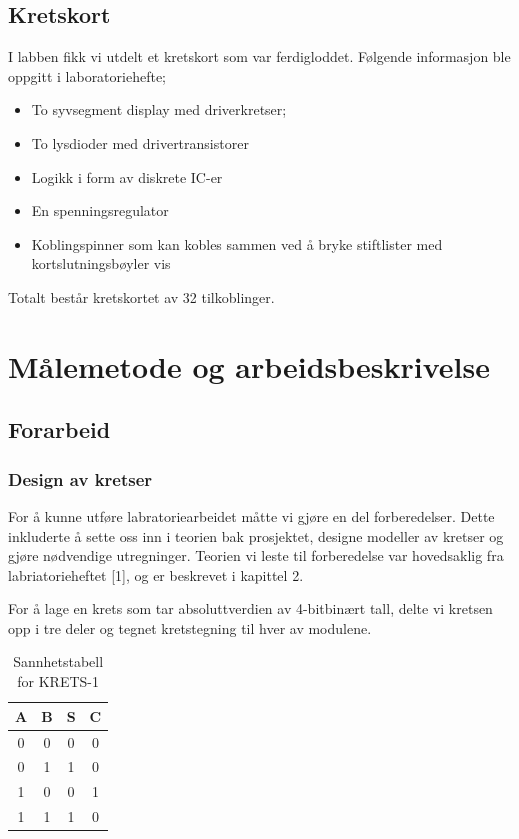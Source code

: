 \documentclass{article}
\begin{document}
\subsection{Kretskort}
I labben fikk vi utdelt et kretskort som var ferdigloddet. Følgende informasjon ble oppgitt i laboratoriehefte;
\begin{itemize}
	\item To syvsegment display med driverkretser;
	\item To lysdioder med drivertransistorer
	\item Logikk i form av diskrete IC-er
	\item En spenningsregulator
	\item Koblingspinner som kan kobles sammen ved å bryke stiftlister med kortslutningsbøyler
	vis
\end{itemize}
Totalt består kretskortet av 32 tilkoblinger.


\section{Målemetode og arbeidsbeskrivelse}

\subsection{Forarbeid}
\subsubsection{Design av kretser}
For å kunne utføre labratoriearbeidet måtte vi gjøre en del forberedelser. Dette inkluderte å sette oss inn i teorien bak prosjektet, designe modeller av kretser og gjøre nødvendige utregninger. Teorien vi leste til forberedelse var hovedsaklig fra labriatorieheftet [1], og er beskrevet i kapittel 2.

For å lage en krets som tar absoluttverdien av 4-bitbinært tall, delte vi kretsen opp i tre deler og tegnet kretstegning til hver av modulene.

\begin{table}[h]
	\centering
	\caption{Sannhetstabell for KRETS-1}
	\label{tab:sannhet1}
	\vspace{0.2cm}
	\begin{tabular} {| c | c | c | c |} \hline
		A & B & S & C \\ \hline
		0 & 0 & 0 & 0 \\ \hline
		0 & 1 & 1 & 0 \\ \hline
		1 & 0 & 0 & 1 \\ \hline
		1 & 1 & 1 & 0 \\ \hline
	\end{tabular}
\end{table}
\end{document}
